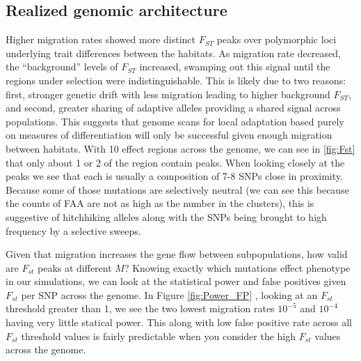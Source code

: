 \documentclass{article}
\begin{document}
\subsection*{Realized genomic architecture}

Higher migration rates showed more distinct $F_{ST}$ peaks
over polymorphic loci underlying trait differences between the habitats.
As migration rate decreased, the ``background'' levels of $F_{ST}$ increased,
swamping out this signal until the regions under selection were indistinguishable. 
This is likely due to two reasons: 
first, stronger genetic drift with less migration leading to higher background $F_{ST}$,
and second, greater sharing of adaptive alleles providing a shared signal across populations.
This suggests that genome scans for local adaptation
based purely on measures of differentiation
will only be successful given enough migration between habitats.
With 10 effect regions across the genome, we can see in \ref{fig:Fst} that only about 1 or 2 of the region contain peaks. 
When looking closely at the peaks we see that each is usually a composition of 7-8 SNPs close in proximity.
Because some of those mutations are selectively neutral (we can see this because the counts of FAA are not as high as the number in the clusters),
this is suggestive of hitchhiking alleles along with the SNPs being brought to high frequency by a selective sweeps.

Given that migration increases the gene flow between subpopulations, how valid are $F_{st}$ peaks at different $M$?
Knowing exactly which mutations effect phenotype in our simulations, 
we can look at the statistical power and false positives given $F_{st}$ per SNP across the genome. 
In Figure \ref{fig:Power_FP} , looking at an $F_{st}$ threshold greater than 1, 
we see the two lowest migration rates $10^{-5}$ and $10^{-4}$ having very little statical power. 
This along with low false positive rate across all $F_{st}$ threshold values is fairly predictable when you consider the high $F_{st}$ values across the genome. 
\end{document}
